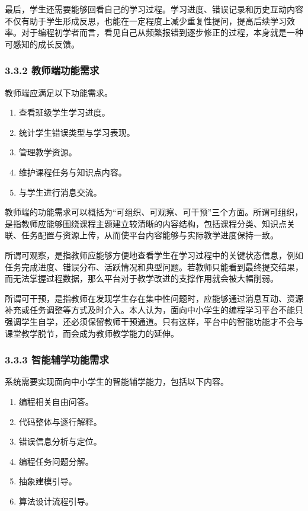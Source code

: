 最后，学生还需要能够回看自己的学习过程。学习进度、错误记录和历史互动内容不仅有助于学生形成反思，也能在一定程度上减少重复性提问，提高后续学习效率。对于编程初学者而言，看见自己从频繁报错到逐步修正的过程，本身就是一种可感知的成长反馈。

\subsubsection{3.3.2 教师端功能需求}\label{ux6559ux5e08ux7aefux529fux80fdux9700ux6c42}

教师端应满足以下功能需求。

\begin{enumerate}
\def\labelenumi{(\arabic{enumii})}
\tightlist
\item
  查看班级学生学习进度。
\item
  统计学生错误类型与学习表现。
\item
  管理教学资源。
\item
  维护课程任务与知识点内容。
\item
  与学生进行消息交流。
\end{enumerate}

教师端的功能需求可以概括为``可组织、可观察、可干预''三个方面。所谓可组织，是指教师应能够围绕课程主题建立较清晰的内容结构，包括课程分类、知识点关联、任务配置与资源上传，从而使平台内容能够与实际教学进度保持一致。

所谓可观察，是指教师应能够方便地查看学生在学习过程中的关键状态信息，例如任务完成进度、错误分布、活跃情况和典型问题。若教师只能看到最终提交结果，而无法掌握过程数据，那么平台对于教学改进的支撑作用就会被大幅削弱。

所谓可干预，是指教师在发现学生存在集中性问题时，应能够通过消息互动、资源补充或任务调整等方式及时介入。本人认为，面向中小学生的编程学习平台不能只强调学生自学，还必须保留教师干预通道。只有这样，平台中的智能功能才不会与课堂教学脱节，而会成为教师教学能力的延伸。

\subsubsection{3.3.3 智能辅学功能需求}\label{ux667aux80fdux8f85ux5b66ux529fux80fdux9700ux6c42}

系统需要实现面向中小学生的智能辅学能力，包括以下内容。

\begin{enumerate}
\def\labelenumi{(\arabic{enumii})}
\tightlist
\item
  编程相关自由问答。
\item
  代码整体与逐行解释。
\item
  错误信息分析与定位。
\item
  编程任务问题分解。
\item
  抽象建模引导。
\item
  算法设计流程引导。
\end{enumerate}

